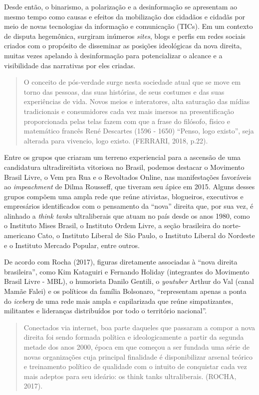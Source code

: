 Desde então, o binarismo, a polarização e a desinformação se apresentam
ao mesmo tempo como causas e efeitos da mobilização dos cidadãos e
cidadãs por meio de novas tecnologias da informação e comunicação
(TICs). Em um contexto de disputa hegemônica, surgiram inúmeros
\emph{sites}, blogs e perfis em redes sociais criados com o propósito de
disseminar as posições ideológicas da nova direita, muitas vezes
apelando à desinformação para potencializar o alcance e a visibilidade
das narrativas por eles criadas.

\begin{quote}
O conceito de pós-verdade surge nesta sociedade atual que se move em
torno das pessoas, das suas histórias, de seus costumes e das suas
experiências de vida. Novos meios e interatores, alta saturação das
mídias tradicionais e consumidores cada vez mais imersos na
presentificação proporcionada pelas telas fazem com que a frase do
filósofo, físico e matemático francês René Descartes (1596 - 1650)
``Penso, logo existo'', seja alterada para vivencio, logo existo.
(FERRARI, 2018, p.22).
\end{quote}

Entre os grupos que criaram um terreno experiencial para a ascensão de
uma candidatura ultradireitista vitoriosa no Brasil, podemos destacar o
Movimento Brasil Livre, o Vem pra Rua e o Revoltados Online, nas
manifestações favoráveis ao \emph{impeachment} de Dilma Rousseff, que
tiveram seu ápice em 2015. Alguns desses grupos compõem uma ampla rede
que reúne ativistas, blogueiros, executivos e empresários identificados
com o pensamento da ``nova'' direita que, por sua vez, é alinhado a
\emph{think tanks} ultraliberais que atuam no país desde os anos 1980,
como o Instituto Mises Brasil, o Instituto Ordem Livre, a seção
brasileira do norte-americano Cato, o Instituto Liberal de São Paulo, o
Instituto Liberal do Nordeste e o Instituto Mercado Popular, entre
outros.

De acordo com Rocha (2017), figuras diretamente associadas à ``nova
direita brasileira'', como Kim Kataguiri e Fernando Holiday (integrantes
do Movimento Brasil Livre - MBL), o humorista Danilo Gentili, o
\emph{youtuber} Arthur do Val (canal Mamãe Falei) e os políticos da
família Bolsonaro, ``representam apenas a ponta do \emph{iceberg} de uma
rede mais ampla e capilarizada que reúne simpatizantes, militantes e
lideranças distribuídos por todo o território nacional''.

\begin{quote}
Conectados via internet, boa parte daqueles que passaram a compor a nova
direita foi sendo formada política e ideologicamente a partir da segunda
metade dos anos 2000, época em que começou a ser fundada uma série de
novas organizações cuja principal finalidade é disponibilizar arsenal
teórico e treinamento político de qualidade com o intuito de conquistar
cada vez mais adeptos para seu ideário: os think tanks ultraliberais.
(ROCHA, 2017).
\end{quote}

